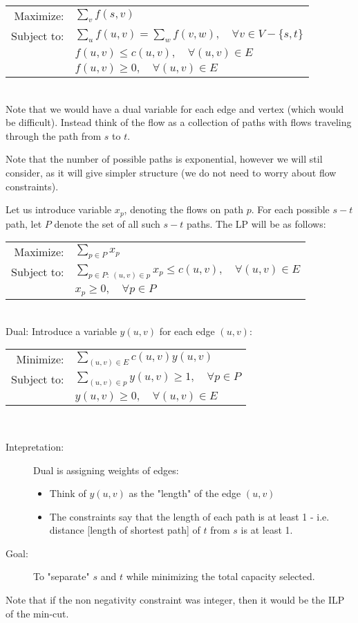 \documentclass[../main/main.tex]{subfiles}
\begin{document}
\begin{tabular}{rl}
	Maximize: &$\sum_{v} f(s,v)$ \\
	Subject to:& $\sum_{u} f(u,v)=\sum_{w}f(v,w),\quad \forall v\in V-\{s,t\} $\\
			   &$f(u,v)\le c(u,v),\quad \forall (u,v) \in E$\\
			   &$f(u,v)\ge 0,\quad\forall (u,v)\in E$
\end{tabular}\\

Note that we would have a dual variable for each edge and vertex (which would be difficult). Instead think of the flow as a collection of paths with flows traveling through the path from $s$ to $t$.
\begin{remark}
	Note that the number of possible paths is exponential, however we will stil consider, as it will give simpler structure (we do not need to worry about flow constraints).
\end{remark}
Let us introduce variable $x_p$, denoting the flows on path $p$. For each possible $s-t$ path, let $P$ denote the set of all such $s-t$ paths. The LP will be as follows:\\

\begin{tabular}{rl}
	Maximize: &$\sum_{p\in P}x_p$ \\
	Subject to:& $\sum_{p \in P:\ (u,v)\in p} x_p\le c(u,v),\quad \forall (u,v)\in E$\\
			   &$x_p\ge 0,\quad\forall p \in P$
\end{tabular}\\

Dual: Introduce a variable $y(u,v)$ for each edge $(u,v)$:\\

\begin{tabular}{rl}
	Minimize: &$\sum_{(u,v)\in E}c(u,v)y(u,v)$\\
	Subject to: & $\sum_{(u,v)\in p}y(u,v) \ge 1,\quad\forall p\in P$\\
				&$y(u,v)\ge 0,\quad\forall (u,v)\in E$
\end{tabular}\\

\begin{description}
	\item[Intepretation:] Dual is assigning weights of edges:
		\begin{itemize}
			\item Think of $y(u,v)$ as the "length" of the edge $(u,v)$
			\item The constraints say that the length of each path is at least 1 - i.e. distance [length of shortest path] of $t$ from $s$ is at least 1.
		\end{itemize}
	\item[Goal:] To "separate" $s$ and $t$ while minimizing the total capacity selected.
\end{description}
\begin{remark}
	Note that if the non negativity constraint was integer, then it would be the ILP of the min-cut. 
\end{remark}
\end{document}
